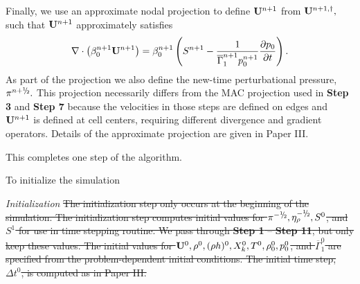 \documentclass{aastex62}
\newcommand{\sfrac}[2]{\mathchoice
  {\kern0em\raise.5ex\hbox{\the\scriptfont0 #1}\kern-.15em/
   \kern-.15em\lower.25ex\hbox{\the\scriptfont0 #2}}
  {\kern0em\raise.5ex\hbox{\the\scriptfont0 #1}\kern-.15em/
   \kern-.15em\lower.25ex\hbox{\the\scriptfont0 #2}}
  {\kern0em\raise.5ex\hbox{\the\scriptscriptfont0 #1}\kern-.2em/
   \kern-.15em\lower.25ex\hbox{\the\scriptscriptfont0 #2}}
  {#1\!/#2}}
\newcommand{\myhalf}{\sfrac{1}{2}}
\newcommand{\Ub}{{\bf{U}}}
\newcommand{\dt}{\Delta t}
\newcommand{\gammaonebar}{\overline{\Gamma}_1}
\newcommand{\nph}{{n+\myhalf}}
\begin{document}
\begin{description}
Finally, we use an approximate nodal projection to define $\Ub^{n+1}$
from $\Ub^{n+1,\dagger},$  such that $\Ub^{n+1}$ approximately
satisfies
\begin{equation}
\nabla \cdot \left(\beta_0^{n+1} \Ub^{n+1} \right) = \beta_0^{n+1} \left( S^{n+1} - \frac{1}{\gammaonebar^{n+1}p_0^{n+1}}\frac{\partial p_0}{\partial t} \right).
\end{equation}
As part of the projection we also define the new-time perturbational pressure,
$\pi^\nph.$  This projection necessarily differs from the MAC projection used in
{\bf Step 3} and {\bf Step 7} because the velocities in those steps are defined
on edges and $\Ub^{n+1}$ is defined at cell centers, requiring different divergence
and gradient operators.  Details of the approximate projection are given in Paper III.

\end{description}

This completes one step of the algorithm.

To initialize the simulation



{\em Initialization}
\sout{
The initialization step only occurs at the beginning of the simulation.
The initialization step computes initial values for 
$\pi^{-\myhalf}, \eta_{\rho}^{-\myhalf}, S^0$, and $S^1$ for use in time stepping routine.  
We pass through {\bf Step 1} -- {\bf Step 11}, but only keep these values.
The initial values for $\Ub^0, \rho^0, (\rho h)^0, X_k^0, T^0,
\rho_0^0, p_0^0$, and $\gammaonebar^0$ are specified from the problem-dependent
initial conditions.  The initial time step, $\dt^0$, is computed as in
Paper III.
}
\end{document}
